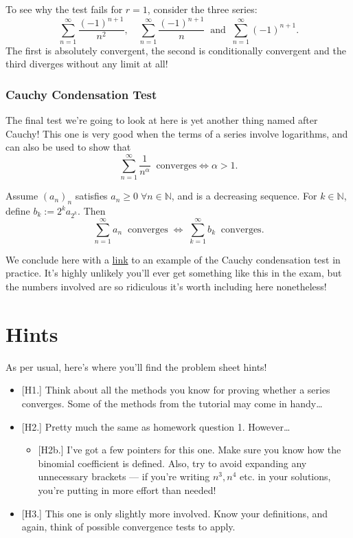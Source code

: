 \documentclass[
  10pt,
  a4paper]{article}
\providecommand{\tightlist}{%
  \setlength{\itemsep}{0pt}\setlength{\parskip}{0pt}}
\theoremstyle{plain}
\theoremstyle{definition}
\theoremstyle{plain}
\theoremstyle{plain}
\theoremstyle{plain}
\theoremstyle{plain}
\theoremstyle{definition}
\theoremstyle{definition}
\theoremstyle{remark}
\theoremstyle{remark}
\let\BeginKnitrBlock\begin \let\EndKnitrBlock\end
\begin{document}
To see why the test fails for \(r = 1\), consider the three series: \[\sum_{n = 1}^{\infty} \frac{(-1)^{n+1}}{n^2}, \quad \sum_{n = 1}^{\infty} \frac{(-1)^{n+1}}{n} \;\; \text{and} \;\; \sum_{n = 1}^{\infty} (-1)^{n+1}.\] The first is absolutely convergent, the second is conditionally convergent and the third diverges without any limit at all!

\hypertarget{cauchy-condensation-test}{%
\subsubsection{Cauchy Condensation Test}\label{cauchy-condensation-test}}

The final test we're going to look at here is yet another thing named after Cauchy! This one is very good when the terms of a series involve logarithms, and can also be used to show that \[\sum_{n = 1}^{\infty} \frac{1}{n^{\alpha}} \;\;\text{converges} \Longleftrightarrow \alpha > 1.\]

\BeginKnitrBlock{theorem}[Cauchy]
{\label{thm:thm5} }Assume \((a_n)_n\) satisfies \(a_n \geq 0 \; \forall n \in \mathbb{N}\), and is a decreasing sequence. For \(k \in \mathbb{N}\), define \(b_k := 2^ka_{2^k}\). Then \[\sum_{n = 1}^{\infty} a_n \;\; \text{converges}\; \Longleftrightarrow\; \sum_{k = 1}^{\infty} b_k \;\; \text{converges}.\]
\EndKnitrBlock{theorem}

We conclude here with a \href{https://math.stackexchange.com/questions/2071016/does-sum-infty-3-fracn2lnlnnlnn-converge?rq=1}{link} to an example of the Cauchy condensation test in practice. It's highly unlikely you'll ever get something like this in the exam, but the numbers involved are so ridiculous it's worth including here nonetheless!

\hypertarget{hints}{%
\section{Hints}\label{hints}}

As per usual, here's where you'll find the problem sheet hints!

\begin{itemize}
\tightlist
\item
  {[}H1.{]} Think about all the methods you know for proving whether a series converges. Some of the methods from the tutorial may come in handy\ldots{}
\item
  {[}H2.{]} Pretty much the same as homework question 1. However\ldots{}

  \begin{itemize}
  \tightlist
  \item
    {[}H2b.{]} I've got a few pointers for this one. Make sure you know how the binomial coefficient is defined. Also, try to avoid expanding any unnecessary brackets --- if you're writing \(n^3, n^4\) etc. in your solutions, you're putting in more effort than needed!
  \end{itemize}
\item
  {[}H3.{]} This one is only slightly more involved. Know your definitions, and again, think of possible convergence tests to apply.
\end{itemize}
\end{document}
